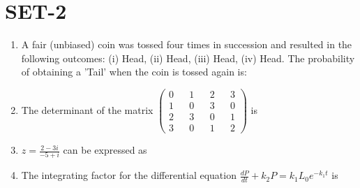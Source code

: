 \documentclass[journal,12pt,onecolumn]{IEEEtran}
\theoremstyle{remark}
\begin{document}
\section{SET-2}
\begin{enumerate}
    \item A fair (unbiased) coin was tossed four times in succession and resulted in the following outcomes: (i) Head, (ii) Head, (iii) Head, (iv) Head. The probability of obtaining a 'Tail' when the coin is tossed again is:
    \begin{enumerate}
    \end{enumerate}


\item The determinant of the matrix $\begin{pmatrix}
0 && 1 && 2 && 3 \\ 1 && 0 && 3 && 0 \\ 2 && 3 && 0 && 1 \\ 3 && 0 && 1 && 2 \end{pmatrix}$ is \underline{\hspace{1cm}}

\item $ z = \frac{2 - 3 i}{-5 + i}$ can be expressed as
\begin{enumerate}
\end{enumerate}

\item The integrating factor for the differential equation $\frac{dP}{dt} + k_{2}P = k_{1}L_{0} e^{-k_{1}t}$ is 
\begin{enumerate}
\end{enumerate}


\end{enumerate}
\end{document}
